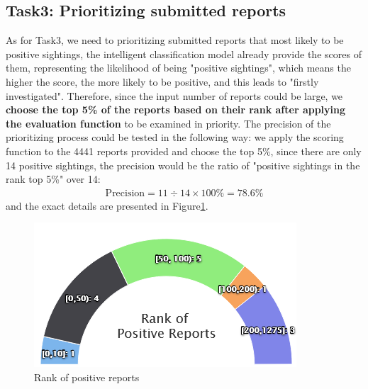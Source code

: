 \documentclass{mcmthesis}
\begin{document}
	\subsection{Task3: Prioritizing submitted reports}
	\quad As for Task3, we need to prioritizing submitted reports that most likely to be positive sightings, the intelligent classification model already provide the scores of them, representing the likelihood of being "positive sightings", which means the higher the score, the more likely to be positive, and this leads to "firstly investigated". Therefore, since the input number of reports could be large, we \textbf{choose the top 5\% of the reports based on their rank after applying the evaluation function} to be examined in priority. The precision of the prioritizing process could be tested in the following way: we apply the scoring function to the 4441 reports provided and choose the top 5\%, since there are only 14 positive sightings, the precision would be the ratio of "positive sightings in the rank top 5\%" over 14:
	\begin{align*}
	\text{Precision} = 11\div14 \times 100\% = 78.6\%
	\end{align*} 
	and the exact details are presented in Figure\ref{t3}.
	\begin{figure}[h]
		\centering
		\includegraphics[scale=0.85]{task3.png}
		\caption{Rank of positive reports}
		\label{t3}
	\end{figure}
\end{document}
